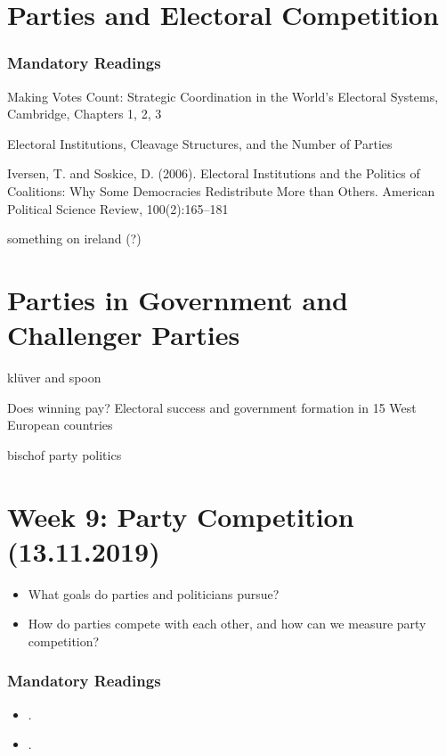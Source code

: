 \documentclass[abstract=on,parskip=full,headings=standardclasses,fontsize=11pt,paper=a4]{scrartcl}
\begin{document}
\section{Parties and Electoral Competition}


\subsubsection*{Mandatory Readings}

Making Votes Count: Strategic Coordination in the World's Electoral Systems, Cambridge, Chapters 1, 2, 3


Electoral Institutions, Cleavage Structures, and the Number of Parties


Iversen, T. and Soskice, D. (2006). Electoral Institutions and the Politics of Coalitions: Why Some Democracies Redistribute More than Others. American Political Science Review, 100(2):165–181

something on ireland (?)


\section{Parties in Government and Challenger Parties}

klüver and spoon


Does winning pay? Electoral success and government formation in 15 West European countries

bischof party politics


\section{Week 9:  Party Competition (13.11.2019)}

\begin{itemize}
\renewcommand\labelitemi{--}
\item What goals do parties and politicians pursue?
\item How do parties compete with each other, and how can we measure party competition?
\end{itemize}

\subsubsection*{Mandatory Readings}
\begin{itemize}
\item {}.
\item {}.
\end{itemize}
\end{document}
